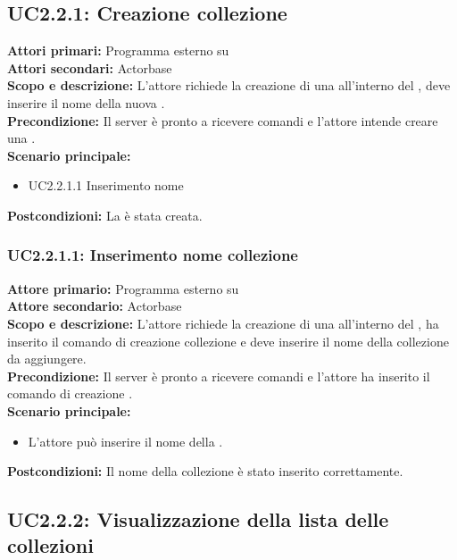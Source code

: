 \documentclass{scalatekids-article}
\begin{document}
\subsection{UC2.2.1: Creazione collezione}

\textbf{Attori primari:} Programma esterno su \\
\textbf{Attori secondari:} Actorbase\\
\textbf{Scopo e descrizione:} L'attore richiede la creazione di una  all'interno del , deve inserire il nome della nuova .\\
\textbf{Precondizione:} Il server è pronto a ricevere comandi e l'attore intende creare una .\\
\textbf{Scenario principale:}
\begin{itemize}
\item UC2.2.1.1 Inserimento nome 
\end{itemize}
\textbf{Postcondizioni:} La  è stata creata.

\subsubsection{UC2.2.1.1: Inserimento nome collezione}

\textbf{Attore primario:} Programma esterno su \\
\textbf{Attore secondario:} Actorbase\\
\textbf{Scopo e descrizione:} L'attore richiede la creazione di una  all'interno del , ha inserito il comando di creazione collezione e deve inserire il nome della collezione da aggiungere.\\
\textbf{Precondizione:} Il server è pronto a ricevere comandi e l'attore ha inserito il comando di creazione .\\
\textbf{Scenario principale:}
\begin{itemize}
\item L'attore può inserire il nome della .
\end{itemize}
\textbf{Postcondizioni:} Il nome della collezione è stato inserito correttamente.

\subsection{UC2.2.2: Visualizzazione della lista delle collezioni}
\end{document}
